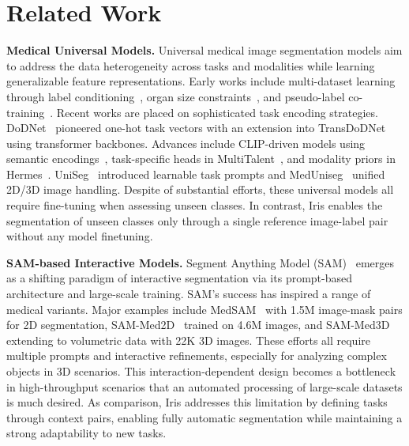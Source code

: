 \section{Related Work}
\label{sec:related_work}

\noindent\textbf{Medical Universal Models.}
Universal medical image segmentation models aim to address the data heterogeneity across tasks and modalities while learning generalizable feature representations. Early works include multi-dataset learning through label conditioning~\cite{dmitriev2019learning}, organ size constraints~\cite{zhou2019prior}, and pseudo-label co-training~\cite{huang2020multi}. Recent works are placed on sophisticated task encoding strategies. DoDNet~\cite{zhang2021dodnet} pioneered one-hot task vectors with an extension into TransDoDNet~\cite{xie2023learning} using transformer backbones. Advances include CLIP-driven models using semantic encodings~\cite{liu2023clip}, task-specific heads in MultiTalent~\cite{ulrich2023multitalent}, and modality priors in Hermes~\cite{gao2024training}. UniSeg~\cite{ye2023uniseg} introduced learnable task prompts and MedUniseg~\cite{ye2024meduniseg} unified 2D/3D image handling. Despite of substantial efforts, these universal models all require fine-tuning when assessing unseen classes. In contrast, Iris enables the segmentation of unseen classes only through a single reference image-label pair without any model finetuning.

 

\noindent\textbf{SAM-based Interactive Models.}
Segment Anything Model (SAM)~\cite{kirillov2023segment} emerges as a shifting paradigm of interactive segmentation via its prompt-based architecture and large-scale training. SAM's success has inspired a range of medical variants. Major examples include  MedSAM~\cite{ma2024segment} with 1.5M image-mask pairs for 2D segmentation, SAM-Med2D~\cite{cheng2023sam} trained on 4.6M images, and SAM-Med3D~\cite{wang2024sam} extending to volumetric data with 22K 3D images. These efforts all require multiple prompts and interactive refinements, especially for analyzing complex objects in 3D scenarios. This interaction-dependent design becomes a bottleneck in high-throughput scenarios that an automated processing of large-scale datasets is much desired. As comparison, Iris addresses this limitation by defining tasks through context pairs, enabling fully automatic segmentation while maintaining a strong adaptability to new tasks.


